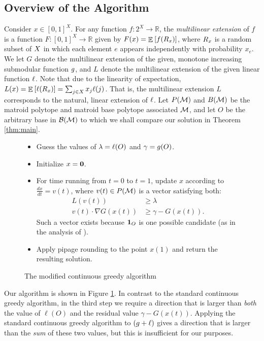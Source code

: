\documentclass{article}
\newcommand{\reals}{\ensuremath{\mathbb{R}}}
\DeclareMathOperator*{\expectOp}{\mathbb{E}}
\newcommand{\expect}[2][]{\expectOp_{#1}\left[#2\right]}
\theoremstyle{definition}
\begin{document}
\subsection{Overview of the Algorithm}
Consider $x\in [0,1]^{X}$.  For any function $f : 2^{X}\to \reals$, the \emph{multilinear extension}  of $f$ is a function $F : [0,1]^{X} \to \reals$ given by $F(x) = \expect{f(\cR_{x})}$, where $R_{x}$ is a random subset of $X$ in which each element $e$ appears independently with probability $x_{e}$.  We let $G$ denote the multilinear extension of the given, monotone increasing submodular function $g$, and $L$ denote the multilinear extension of the given linear function $\ell$.
Note that due to the linearity of expectation, $L(x) = \expect{\lin(\cR_{x})} = \sum_{j \in X}x_{j}\lin(j)$.  That is, the multilinear extension $L$ corresponds to the natural, linear extension of $\ell$.  Let $P(\mathcal{M})$ and $B(\mathcal{M})$ be the matroid polytope and matroid base polytope associated $\mathcal{M}$, and let $O$ be the arbitrary base in $\mathcal{B}(\mathcal{M})$ to which we shall compare our solution in Theorem \ref{thm:main}.
\begin{figure}
\begin{framed}
\begin{itemize}[itemsep=0ex, topsep=0.5ex]
\item Guess the values of $\lambda = \ell(O)$ and $\gamma = g(O)$.
\item Initialize $x = {\bf 0}$.
\item For time running from $t=0$ to $t=1$, update $x$ according to $\frac{dx}{dt} = v(t)$,
where $v(t) \in P(\mathcal{M})$ is a vector satisfying both:
\begin{align*}
L(v(t)) &\geq \lambda \\
v(t) \cdot \nabla G(x(t)) &\geq \gamma - G(x(t)).
\end{align*}
Such a vector exists because $\mathbf{1}_{O}$ is one possible candidate (as in the analysis of \cite{Calinescu2011}).
\item Apply pipage rounding to the point $x(1)$ and return the resulting solution.
\end{itemize}
\end{framed}
\caption{The modified continuous greedy algorithm}
\label{fig:cont-greedy-alg}
\end{figure}
Our algorithm is shown in Figure \ref{fig:cont-greedy-alg}.
In contrast to the standard continuous greedy algorithm, in the third step we require a direction that is larger than \emph{both} the value of $\ell(O)$ and the residual value $\gamma - G(x(t))$.  Applying the standard continuous greedy algorithm to $(g + \ell)$ gives a direction that is larger than the \emph{sum} of these two values, but this is insufficient for our purposes.  
\end{document}
